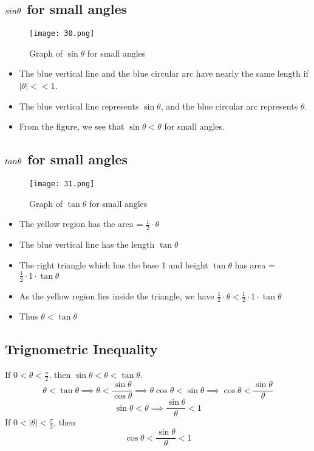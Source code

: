 \subsection{\(\\sin \theta\) for small angles}
\begin{figure}
    \centering
    \texttt{[image: 30.png]}
    \caption{Graph of $\sin \theta$ for small angles}
\end{figure}
\begin{itemize}
    \item The blue vertical line and the blue circular arc have nearly the same length if $|\theta| << 1$.
    \item The blue vertical line represents $\sin \theta$, and the blue circular arc represents $\theta$.
    \item From the figure, we see that $\sin \theta < \theta$ for small angles.
\end{itemize}

\subsection{\(\\tan \theta\) for small angles}
\begin{figure}
    \centering
    \texttt{[image: 31.png]}
    \caption{Graph of $\tan \theta$ for small angles}
\end{figure}
\begin{itemize}
    \item The yellow region has the area = $\frac{1}{2} \cdot \theta$
    \item The blue vertical line has the length $\tan \theta$
    \item The right triangle which has the base 1 and height $\tan \theta$ has area = $\frac{1}{2} \cdot 1 \cdot \tan \theta$
    \item As the yellow region lies inside the triangle, we have $\frac{1}{2} \cdot \theta < \frac{1}{2} \cdot 1 \cdot \tan \theta$
    \item Thus $\theta < \tan \theta$
\end{itemize}

\subsection{Trignometric Inequality}
If $ 0 < \theta < \frac{\pi}{2} $, then $\sin \theta < \theta < \tan \theta $.
\begin{displaymath}
    \theta < \tan \theta \implies \theta < \frac{\sin \theta}{\cos \theta} \implies \theta \cos \theta < \sin \theta \implies \cos \theta < \frac{\sin \theta}{\theta}
\end{displaymath}
\begin{displaymath}
    \sin \theta < \theta \implies \frac{\sin \theta}{\theta} < 1
\end{displaymath}
If $ 0 < |\theta| < \frac{\pi}{2} $, then
\[ \cos \theta <  \frac{\sin \theta}{\theta} < 1 \]

